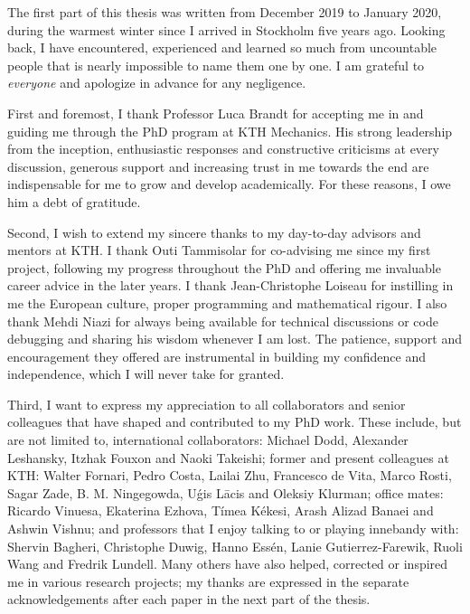 \begin{acknowledgements}

  The first part of this thesis was written from December 2019 to January 2020, during the warmest winter since I arrived in Stockholm five years ago.
  Looking back, I have encountered, experienced and learned so much from uncountable people that is nearly impossible to name them one by one.
  I am grateful to \emph{everyone} and apologize in advance for any negligence.

  First and foremost, I thank Professor Luca Brandt for accepting me in and guiding me through the PhD program at KTH Mechanics.
  His strong leadership from the inception,
  enthusiastic responses and constructive criticisms at every discussion,
  generous support and increasing trust in me towards the end are indispensable for me to grow and develop academically.
  For these reasons, I owe him a debt of gratitude.

  Second, I wish to extend my sincere thanks to my day-to-day advisors and mentors at KTH.
  I thank Outi Tammisolar for co-advising me since my first project, following my progress throughout the PhD
  and offering me invaluable career advice in the later years.
  I thank Jean-Christophe Loiseau for instilling in me the European culture, proper programming and mathematical rigour.
  I also thank Mehdi Niazi for always being available for technical discussions or code debugging and sharing his wisdom whenever I am lost.
  The patience, support and encouragement they offered are instrumental in building my confidence and independence, which I will never take for granted.

  Third, I want to express my appreciation to all collaborators and senior colleagues that have shaped and contributed to my PhD work.
  These include, but are not limited to, international collaborators: Michael Dodd, Alexander Leshansky, Itzhak Fouxon and Naoki Takeishi;
  former and present colleagues at KTH: Walter Fornari, Pedro Costa, Lailai Zhu, Francesco de Vita, Marco Rosti, Sagar Zade, B. M. Ningegowda, U\'{g}is L\={a}cis and Oleksiy Klurman;
  office mates: Ricardo Vinuesa, Ekaterina Ezhova, Tímea Kékesi, Arash Alizad Banaei and Ashwin Vishnu;
  and professors that I enjoy talking to or playing innebandy with:
  Shervin Bagheri, Christophe Duwig, Hanno Essén, Lanie Gutierrez-Farewik, Ruoli Wang and Fredrik Lundell.
  Many others have also helped, corrected or inspired me in various research projects;
  my thanks are expressed in the separate acknowledgements after each paper in the next part of the thesis.
  

\end{acknowledgements}
